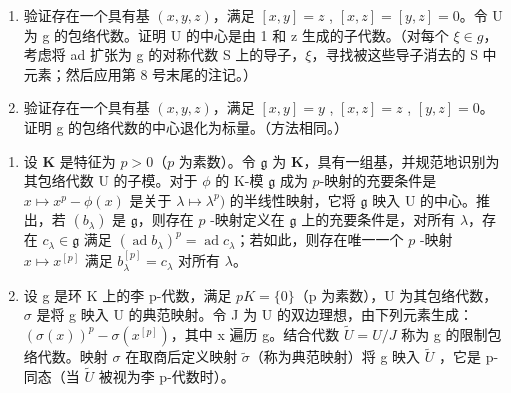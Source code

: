 \begin{enumerate}
\def\labelenumi{(\alph{enumi})}
\item
  验证存在一个具有基 \((x, y, z)\)，满足 \([x, y] = z\) , \([x, z] = [y, z] = 0\)。令 U 为 g 的包络代数。证明 U 的中心是由 1 和 z 生成的子代数。（对每个 \(\xi \in g\)，考虑将 ad 扩张为 g 的对称代数 S 上的导子，\(\xi\)，寻找被这些导子消去的 S 中元素；然后应用第 8 号末尾的注记。）
\item
  验证存在一个具有基 \((x, y, z)\)，满足 \([x, y] = y\) , \([x, z] = z\) , \([y, z] = 0\)。证明 g 的包络代数的中心退化为标量。（方法相同。）
\end{enumerate}

\begin{enumerate}
\def\labelenumi{\arabic{enumi}.}
\setcounter{enumi}{4}
\item
  设 \(\mathbf{K}\) 是特征为 \(p > 0\)（\(p\) 为素数）。令 \(\mathfrak{g}\) 为 \(\mathbf{K}\)，具有一组基，并规范地识别为其包络代数 U 的子模。对于 \(\phi\) 的 K-模 \(\mathfrak{g}\) 成为 \(p\)-映射的充要条件是 \(x \mapsto x^p - \phi(x)\) 是关于 \(\lambda \mapsto \lambda^p)\) 的半线性映射，它将 \(\mathfrak{g}\) 映入 U 的中心。推出，若 \((b_{\lambda})\) 是 \(\mathfrak{g}\)，则存在 \(p\) -映射定义在 \(\mathfrak{g}\) 上的充要条件是，对所有 \(\lambda\)，存在 \(c_{\lambda} \in \mathfrak{g}\) 满足 \((\operatorname{ad} b_{\lambda})^p = \operatorname{ad} c_{\lambda}\)；若如此，则存在唯一一个 \(p\) -映射 \(x \mapsto x^{[p]}\) 满足 \(b_{\lambda}^{[p]} = c_{\lambda}\) 对所有 \(\lambda\)。
\item
  设 g 是环 K 上的李 p-代数，满足 \(pK = \{0\}\)（p 为素数），U 为其包络代数，\(\sigma\) 是将 g 映入 U 的典范映射。令 J 为 U 的双边理想，由下列元素生成：\((\sigma(x))^{p} - \sigma(x^{[p]})\)，其中 x 遍历 g。结合代数 \(\tilde{U} = U/J\) 称为 g 的限制包络代数。映射 \(\sigma\) 在取商后定义映射 \(\tilde{\sigma}\)（称为典范映射）将 g 映入 \(\tilde{U}\) ，它是 p-同态（当 \(\tilde{U}\) 被视为李 p-代数时）。
\end{enumerate}

